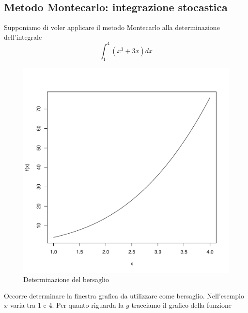\documentclass[onecolumn,11pt]{book}\usepackage[]{graphicx}\usepackage[]{color}
\makeatletter
\def\maxwidth{ %
  \ifdim\Gin@nat@width>\linewidth
    \linewidth
  \else
    \Gin@nat@width
  \fi
}
\newenvironment{knitrout}{}{} %
\makeatother
\begin{document}
\subsection{Metodo Montecarlo: integrazione stocastica}
Supponiamo di voler applicare il metodo Montecarlo alla determinazione dell'integrale
\begin{equation*}
\int_1^4{ (x^3+3x)dx}
\end{equation*}
\begin{figure}[htbp]
\begin{center}
\begin{knitrout}
\color{fgcolor}
\includegraphics[width=\maxwidth]{figure/unnamed-chunk-146-1} 

\end{knitrout}
\caption{Determinazione del bersaglio}
\label{fig:dgefault}
\end{center}
\end{figure}

Occorre determinare la finestra grafica da utilizzare come bersaglio.
Nell'esempio $x$ varia tra 1 e 4.
Per quanto riguarda la  $y$  tracciamo il grafico della funzione
\end{document}
